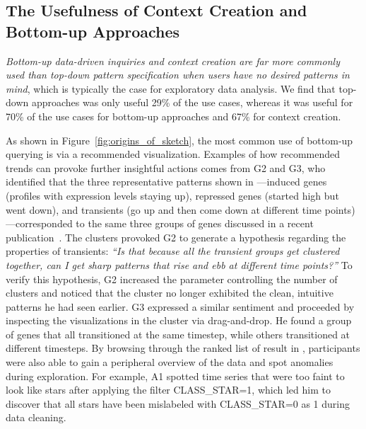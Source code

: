 \subsection{The Usefulness of Context Creation and Bottom-up Approaches}
\par \emph{Bottom-up data-driven inquiries and context creation are far more commonly used than top-down pattern specification when users have no desired patterns in mind}, which is typically the case for exploratory data analysis. We find that top-down approaches was only useful 29\% of the use cases, whereas it was useful for 70\% of the use cases for bottom-up approaches and 67\% for context creation.
\par As shown in Figure~\ref{fig:origins_of_sketch}, the most common use of bottom-up querying is via a recommended visualization. Examples of how recommended trends can provoke further insightful actions comes from G2 and G3, who identified that the three representative patterns shown in \zv---induced genes (profiles with expression levels staying up), repressed genes (started high but went down), and transients (go up and then come down at different time points)---corresponded to the same three groups of genes discussed in a recent publication~\cite{Gloss2017}. The clusters provoked G2 to generate a hypothesis regarding the properties of transients: \textit{``Is that because all the transient groups get clustered together, can I get sharp patterns that rise and ebb at different time points?''} To verify this hypothesis, G2 increased the parameter controlling the number of clusters and noticed that the cluster no longer exhibited the clean, intuitive patterns he had seen earlier. G3 expressed a similar sentiment and proceeded by inspecting the visualizations in the cluster via drag-and-drop. He found a group of genes that all transitioned at the same timestep, while others transitioned at different timesteps.  By browsing through the ranked list of result in \zv, participants were also able to gain a peripheral overview of the data and spot anomalies during exploration. For example, A1 spotted time series that were too faint to look like stars after applying the filter CLASS\_STAR=1, which led him to discover that all stars have been mislabeled with CLASS\_STAR=0 as 1 during data cleaning. 
